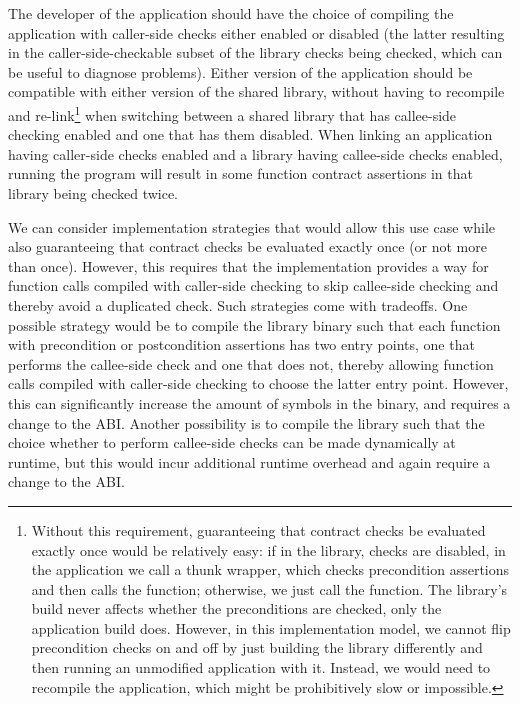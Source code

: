 The developer of the application should have the choice of compiling the application with caller-side checks either enabled or disabled (the latter resulting in the caller-side-checkable subset of the library checks being checked, which can be useful to diagnose problems). Either version of the application should be compatible with either version of the shared library, without having to recompile and re-link\footnote{Without this requirement, guaranteeing that contract checks be evaluated exactly once would be relatively easy: if in the library, checks are disabled, in the application we call a thunk wrapper, which checks precondition assertions and then calls the function; otherwise, we just call the function. The library's build never affects whether the preconditions are checked, only the application build does. However, in this implementation model, we cannot flip precondition checks on and off by just building the library differently and then running an unmodified application with it. Instead, we would need to recompile the application, which might be prohibitively slow or impossible.} when switching between a shared library that has callee-side checking enabled and one that has them disabled. When linking an application having caller-side checks enabled and a library having callee-side checks enabled, running the program will result in some function contract assertions in that library being checked twice.

We can consider implementation strategies that would allow this use case while also guaranteeing that contract checks be evaluated exactly once (or not more than once). However, this requires that the implementation provides a way for function calls compiled with caller-side checking to skip callee-side checking and thereby avoid a duplicated check. Such strategies come with tradeoffs. One possible strategy would be to compile the library binary such that each function with precondition or postcondition assertions has two entry points, one that performs the callee-side check and one that does not, thereby allowing function calls compiled with caller-side checking to choose the latter entry point. However, this can significantly increase the amount of symbols in the binary, and requires a change to the ABI. Another possibility is to compile the library such that the choice whether to perform callee-side checks can be made dynamically at runtime, but this would incur additional runtime overhead and again require a change to the ABI.

